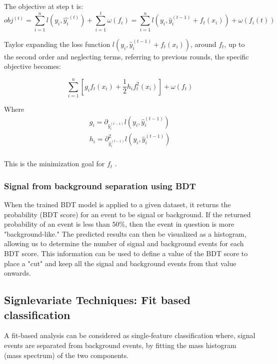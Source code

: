 \begin{itemize}
The objective at step t is:
\begin{equation}
obj^{(t)} = \sum_{i=1}^{n} l(y_{i}, \hat{y_{i}}^{(t)}) + \sum_{i=1}^{t}\omega(f_{i}) = \sum _{i=1}^{n} l(y_{i}, \hat{y}_{i}^{(t-1)} + f_{t}(x_{i})) + \omega(f_{i}(t))
\end{equation}

Taylor expanding the loss function \(l(y_{i}, \hat{y}_{i}^{(t-1)} + f_{t}(x_{i}))\), around \(f_{t}\), up to the second order and neglecting terms, referring to previous rounds, the specific objective becomes:

\begin{equation}
\sum_{i=1}^{n}\left [ g_{i}f_{t}(x_{i})+\frac{1}{2}h_{i}f^{2}_{t} (x_{i}) \right ] + \omega(f_{t})
\end{equation}

Where
\begin{equation}
\begin{matrix}
g_{i} = \partial_{\hat{y}_{i}^{(t-1) }} l(y_{i}, \hat{y}_{i}^{(t-1)} ) \\
h_{i} = \partial^{2}_{\hat{y}_{i}^{(t-1) }} l(y_{i}, \hat{y}_{i}^{(t-1)} ) \\
\end{matrix}
\end{equation}

This is the minimization goal for \(f_{t}\) . \cite{xgboost}
\end{itemize}




\subsubsection{Signal from background separation using BDT}
\label{sec:orga5ba63e}
When the trained BDT model is applied to a given dataset, it returns the probability (BDT score) for an event to be signal or background. If the returned probability of an event is less than \(50\%\), then the event in question is more "background-like." The predicted results can then be visualized as a histogram, allowing us to determine the number of signal and background events for each BDT score. This information can be used to define a value of the BDT score to place a "cut" and keep all the signal and background events from that value onwards.
\subsection{Signlevariate Techniques: Fit based classification}
\label{sec:org96f471c}
A fit-based analysis can be considered as single-feature classification where, signal events  are  separated from  background events, by fitting the mass histogram (mass spectrum) of the two components. 

